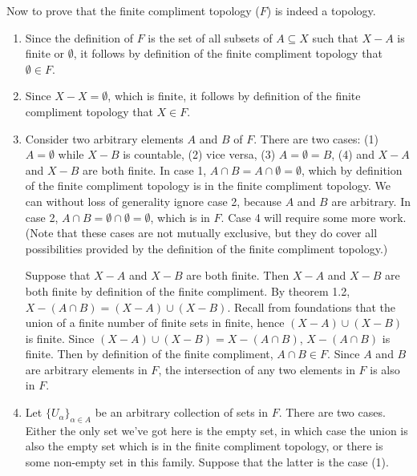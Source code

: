 \documentclass{article}
\theoremstyle{definition}
\begin{document}
 Now to prove that the finite compliment topology ($F$) is indeed a topology.
\begin{enumerate}
    \item Since the definition of $F$ is the set of all subsets of $A\subseteq X$ such that $X-A$ is finite or $\emptyset$, it follows by definition of the finite compliment topology that $\emptyset \in F$.
    \item Since $X -X = \emptyset$, which is finite, it follows by definition of the finite compliment topology that $X\in F$.
    \item Consider two arbitrary elements $A$ and $B$ of $F$. There are two cases: (1) $A = \emptyset$ while $X-B$ is countable, (2) vice versa, (3) $A = \emptyset = B$, (4) and $X-A$ and $X-B$ are both finite. In case 1, $A\cap B = A\cap \emptyset = \emptyset$, which by definition of the finite compliment topology is in the finite compliment topology. We can without loss of generality ignore case 2, because $A$ and $B$ are arbitrary. In case 2, $A\cap B = \emptyset\cap \emptyset = \emptyset$, which is in $F$. Case 4 will require some more work. (Note that these cases are not mutually exclusive, but they do cover all possibilities provided by the definition of the finite compliment topology.)
    
    Suppose that $X-A$ and $X-B$ are both finite. Then $X-A$ and $X-B$ are both finite by definition of the finite compliment. By theorem 1.2, $X-(A\cap B) = (X-A)\cup (X-B)$. Recall from foundations that the union of a finite number of finite sets in finite, hence $(X-A)\cup (X-B)$ is finite. Since $(X-A)\cup (X-B) = X-(A\cap B)$, $ X-(A\cap B) $ is finite. Then by definition of the finite compliment, $A\cap B \in F$. Since $A$ and $B $ are arbitrary elements in $F$, the intersection of any two elements in $F$ is also in $F$.
    \item Let $\{U_\alpha\}_{\alpha\in A}$ be an arbitrary collection of sets in $F$. There are two cases. Either the only set we've got here is the empty set, in which case the union is also the empty set which is in the finite compliment topology, or there is some non-empty set in this family. Suppose that the latter is the case (1). \\
    

\end{enumerate}
\end{document}
